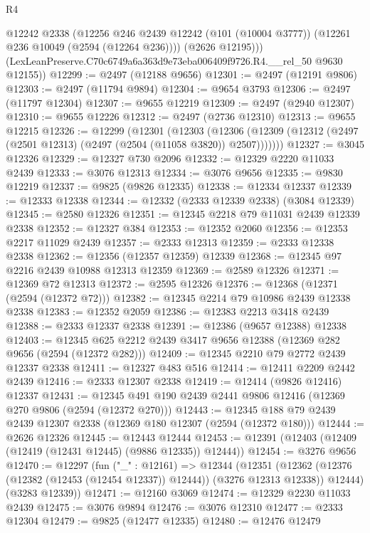 \begin{lexlean}{R4}
\begin{coremodule}
          @12242
          @2338
          (@12256
            @246
            @2439
            @12242
            (@101 (@10004 @3777))
            (@12261 @236 @10049 (@2594 (@12264 @236))))
          (@2626 @12195)))
      (LexLeanPreserve.C70c6749a6a363d9e73eba006409f9726.R4.__rel_50 @9630 @12155))
@12299 := @2497 (@12188 @9656)
@12301 := @2497 (@12191 @9806)
@12303 := @2497 (@11794 @9894)
@12304 := @9654 @3793
@12306 := @2497 (@11797 @12304)
@12307 := @9655 @12219
@12309 := @2497 (@2940 @12307)
@12310 := @9655 @12226
@12312 := @2497 (@2736 @12310)
@12313 := @9655 @12215
@12326 := @12299
    (@12301
      (@12303
        (@12306 (@12309 (@12312 (@2497 (@2501 @12313) (@2497 (@2504 (@11058 @3820)) @2507)))))))
@12327 := @3045 @12326
@12329 := @12327 @730 @2096
@12332 := @12329 @2220 @11033 @2439
@12333 := @3076 @12313
@12334 := @3076 @9656
@12335 := @9830 @12219
@12337 := @9825 (@9826 @12335)
@12338 := @12334 @12337
@12339 := @12333 @12338
@12344 := @12332 (@2333 @12339 @2338) (@3084 @12339)
@12345 := @2580 @12326
@12351 := @12345 @2218 @79 @11031 @2439 @12339 @2338
@12352 := @12327 @384
@12353 := @12352 @2060
@12356 := @12353 @2217 @11029 @2439
@12357 := @2333 @12313
@12359 := @2333 @12338 @2338
@12362 := @12356 (@12357 @12359) @12339
@12368 := @12345 @97 @2216 @2439 @10988 @12313 @12359
@12369 := @2589 @12326
@12371 := @12369 @72 @12313
@12372 := @2595 @12326
@12376 := @12368 (@12371 (@2594 (@12372 @72)))
@12382 := @12345 @2214 @79 @10986 @2439 @12338 @2338
@12383 := @12352 @2059
@12386 := @12383 @2213 @3418 @2439
@12388 := @2333 @12337 @2338
@12391 := @12386 (@9657 @12388) @12338
@12403 := @12345 @625 @2212 @2439 @3417 @9656 @12388 (@12369 @282 @9656 (@2594 (@12372 @282)))
@12409 := @12345 @2210 @79 @2772 @2439 @12337 @2338
@12411 := @12327 @483 @516
@12414 := @12411 @2209 @2442 @2439
@12416 := @2333 @12307 @2338
@12419 := @12414 (@9826 @12416) @12337
@12431 := @12345 @491 @190 @2439 @2441 @9806 @12416 (@12369 @270 @9806 (@2594 (@12372 @270)))
@12443 := @12345 @188 @79 @2439 @2439 @12307 @2338 (@12369 @180 @12307 (@2594 (@12372 @180)))
@12444 := @2626 @12326
@12445 := @12443 @12444
@12453 := @12391 (@12403 (@12409 (@12419 (@12431 @12445) (@9886 @12335)) @12444))
@12454 := @3276 @9656
@12470 := @12297
    (fun ("_" : @12161) =>
    @12344
      (@12351
        (@12362 (@12376 (@12382 (@12453 (@12454 @12337)) @12444)) (@3276 @12313 @12338))
        @12444)
      (@3283 @12339))
@12471 := @12160 @3069
@12474 := @12329 @2230 @11033 @2439
@12475 := @3076 @9894
@12476 := @3076 @12310
@12477 := @2333 @12304
@12479 := @9825 (@12477 @12335)
@12480 := @12476 @12479

\end{coremodule}
\end{lexlean}
